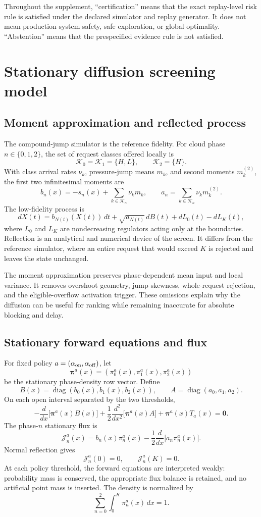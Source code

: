 \documentclass[futureinternet,supfile,submit,moreauthors]{Definitions/mdpi}
\begin{document}
Throughout the supplement, ``certification'' means that the exact replay-level
risk rule is satisfied under the declared simulator and replay generator. It
does not mean production-system safety, safe exploration, or global
optimality. ``Abstention'' means that the prespecified evidence rule is not
satisfied.

\section{Stationary diffusion screening model}
\label{sec:stationary}

\subsection{Moment approximation and reflected process}

The compound-jump simulator is the reference fidelity. For cloud phase
\(n\in\{0,1,2\}\), the set of request classes offered locally is
\[
\mathcal K_0=\mathcal K_1=\{H,L\},
\qquad
\mathcal K_2=\{H\}.
\]
With class arrival rates \(\nu_k\), pressure-jump means \(m_k\), and second
moments \(m_k^{(2)}\), the first two infinitesimal moments are
\[
b_n(x)
=
-s_n(x)+\sum_{k\in\mathcal K_n}\nu_km_k,
\qquad
a_n
=
\sum_{k\in\mathcal K_n}\nu_km_k^{(2)}.
\]
The low-fidelity process is
\[
dX(t)
=
b_{N(t)}(X(t))\,dt
+
\sqrt{a_{N(t)}}\,dB(t)
+
dL_0(t)-dL_K(t),
\]
where \(L_0\) and \(L_K\) are nondecreasing regulators acting only at the
boundaries. Reflection is an analytical and numerical device of the screen.
It differs from the reference simulator, where an entire request that would
exceed \(K\) is rejected and leaves the state unchanged.

The moment approximation preserves phase-dependent mean input and local
variance. It removes overshoot geometry, jump skewness, whole-request
rejection, and the eligible-overflow activation trigger. These omissions
explain why the diffusion can be useful for ranking while remaining inaccurate
for absolute blocking and delay.

\subsection{Stationary forward equations and flux}

For fixed policy \(a=(\alpha_{\rm on},\alpha_{\rm off})\), let
\[
\boldsymbol\pi^a(x)
=
(\pi_0^a(x),\pi_1^a(x),\pi_2^a(x))
\]
be the stationary phase-density row vector. Define
\[
B(x)=\operatorname{diag}(b_0(x),b_1(x),b_2(x)),
\qquad
A=\operatorname{diag}(a_0,a_1,a_2).
\]
On each open interval separated by the two thresholds,
\[
-\frac{d}{dx}\bigl[\boldsymbol\pi^a(x)B(x)\bigr]
+
\frac12\frac{d^2}{dx^2}
\bigl[\boldsymbol\pi^a(x)A\bigr]
+
\boldsymbol\pi^a(x)T_a(x)
=
\boldsymbol 0.
\]
The phase-\(n\) stationary flux is
\[
\mathcal J_n^a(x)
=
b_n(x)\pi_n^a(x)
-
\frac12\frac{d}{dx}\bigl[a_n\pi_n^a(x)\bigr].
\]
Normal reflection gives
\[
\mathcal J_n^a(0)=0,
\qquad
\mathcal J_n^a(K)=0.
\]
At each policy threshold, the forward equations are interpreted weakly:
probability mass is conserved, the appropriate flux balance is retained, and
no artificial point mass is inserted. The density is normalized by
\[
\sum_{n=0}^{2}\int_0^K\pi_n^a(x)\,dx=1.
\]
\end{document}
